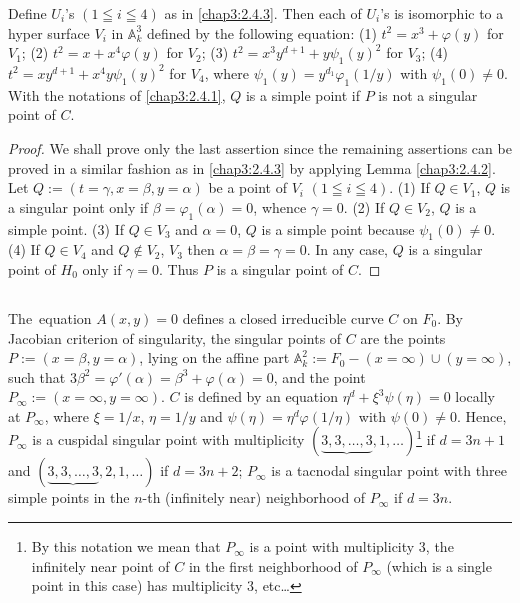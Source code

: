 \begin{lemma*}
Define $U_{i}$'s $(1\leqq i\leqq 4)$ as in \ref{chap3:2.4.3}. Then each of
$U_{i}$'s is isomorphic to a hyper surface $V_{i}$ in
$\mathbb{A}^{3}_{k}$ defined by the following equation: {\rm(1)}
$t^{2}=x^{3}+\varphi(y)$ for $V_{1}$; {\rm(2)}
$t^{2}=x+x^{4}\varphi(y)$ for $V_{2}$; {\rm(3)}
$t^{2}=x^{3}y^{d+1}+y\psi_{1}(y)^{2}$ for $V_{3}$; {\rm(4)}
$t^{2}=xy^{d+1}+x^{4}y\psi_{1}(y)^{2}$ for $V_{4}$, where
$\psi_{1}(y)=y^{d_{1}}\varphi_{1}(1/y)$ with $\psi_{1}(0)\neq 0$. With
the notations of \ref{chap3:2.4.1}, $Q$ is a simple point if $P$ is not a
singular point of $C$.
\end{lemma*}

\begin{proof}
We shall prove only the last assertion since the remaining assertions
can be proved in a similar fashion as in \ref{chap3:2.4.3} by applying Lemma
\ref{chap3:2.4.2}. Let $Q:=(t=\gamma,x=\beta,y=\alpha)$ be a point of
$V_{i}$ $(1\leqq i\leqq 4)$. (1) If $Q\in V_{1}$, $Q$ is a singular
point only if $\beta=\varphi_{1}(\alpha)=0$, whence $\gamma=0$. (2) If
$Q\in V_{2}$, $Q$ is a simple point. (3) If $Q\in V_{3}$ and
$\alpha=0$, $Q$ is a simple point because $\psi_{1}(0)\neq 0$. (4) If
$Q\in V_{4}$ and $Q\not\in V_{2}$, $V_{3}$ then
$\alpha=\beta=\gamma=0$. In any case, $Q$ is a singular point of
$H_{0}$ only if $\gamma=0$. Thus $P$ is a singular point of $C$.
\end{proof}

\subsection{}\label{chap3:2.5}
The\pageoriginale\ equation $A(x,y)=0$ defines a closed irreducible
curve $C$ on $F_{0}$. By Jacobian criterion of singularity, the
singular points of $C$ are the points $P:=(x=\beta,y=\alpha)$, lying
on the affine part $\mathbb{A}^{2}_{k}:=F_{0}-(x=\infty)\cup
(y=\infty)$, such that
$3\beta^{2}=\varphi'(\alpha)=\beta^{3}+\varphi(\alpha)=0$, and the
point $P_{\infty}:=(x=\infty,y=\infty)$. $C$ is defined by an equation
$\eta^{d}+\xi^{3}\psi(\eta)=0$ locally at $P_{\infty}$, where
$\xi=1/x$, $\eta=1/y$ and $\psi(\eta)=\eta^{d}\varphi(1/\eta)$ with
$\psi(0)\neq 0$. Hence, $P_{\infty}$ is a cuspidal singular point with
multiplicity $(\underbrace{3,3,\ldots,3},1,\ldots)$\footnote{By this
  notation we mean that $P_{\infty}$ is a point with multiplicity $3$,
the infinitely near point of $C$ in the first neighborhood of
$P_{\infty}$ (which is a single point in this case) has multiplicity
$3$, etc\ldots} if $d=3n+1$ and
$(\underbrace{3,3,\ldots,3},2,1,\ldots)$ if $d=3n+2$; $P_{\infty}$ is
a tacnodal singular point with three simple points in the $n$-th
(infinitely near) neighborhood of $P_{\infty}$ if $d=3n$.

